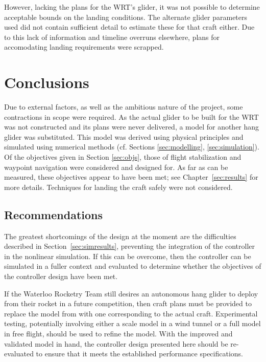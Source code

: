 \documentclass{sydeStyle}
\begin{document}
However, lacking the plans for the WRT's glider, it was not possible to
determine acceptable bounds on the landing conditions. The alternate glider
parameters used did not contain sufficient detail to estimate these for that
craft either.  Due to this lack of information and timeline overruns elsewhere,
plans for accomodating landing requirements were scrapped.

\chapter{Conclusions}
Due to external factors, as well as the ambitious nature of the project, some
contractions in scope were required.  As the actual glider to be built for the
WRT was not constructed and its plans were never delivered, a model for another
hang glider was substituted.  This model was derived using physical principles
and simulated using numerical methods (cf. Sections \ref{sec:modelling},
\ref{sec:simulation}).  Of the objectives given in Section \ref{sec:objs}, those
of flight stabilization and waypoint navigation were considered and designed
for.  As far as can be measured, these objectives appear to have been met; see
Chapter~\ref{sec:results} for more details.  Techniques for landing the craft
safely were not considered.

\section{Recommendations}
\label{sec:recommendations}
The greatest shortcomings of the design at the moment are the difficulties
described in Section~\ref{sec:simresults}, preventing the integration of the
controller in the nonlinear simulation.  If this can be overcome, then the
controller can be simulated in a fuller context and evaluated to determine
whether the objectives of the controller design have been met.

If the Waterloo Rocketry Team still desires an autonomous hang glider to deploy
from their rocket in a future competition, then craft plans must be provided to
replace the model from \cite{spottiswoode} with one corresponding to the actual
craft.  Experimental testing, potentially involving either a scale model in a
wind tunnel or a full model in free flight, should be used to refine the model.
With the improved and validated model in hand, the controller design presented
here should be re-evaluated to ensure that it meets the established performance
specifications.
\end{document}
